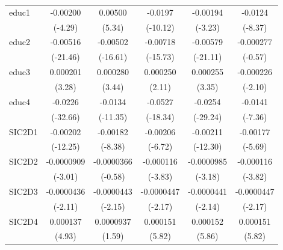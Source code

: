 \begin{table}[htbp]
\begin{tabular}{l*{5}{c}}
educ1       &    -0.00200\sym{***}&     0.00500\sym{***}&     -0.0197\sym{***}&    -0.00194\sym{**} &     -0.0124\sym{***}\\
            &     (-4.29)         &      (5.34)         &    (-10.12)         &     (-3.23)         &     (-8.37)         \\
educ2       &    -0.00516\sym{***}&    -0.00502\sym{***}&    -0.00718\sym{***}&    -0.00579\sym{***}&   -0.000277         \\
            &    (-21.46)         &    (-16.61)         &    (-15.73)         &    (-21.11)         &     (-0.57)         \\
educ3       &    0.000201\sym{**} &    0.000280\sym{***}&    0.000250\sym{*}  &    0.000255\sym{***}&   -0.000226\sym{*}  \\
            &      (3.28)         &      (3.44)         &      (2.11)         &      (3.35)         &     (-2.10)         \\
educ4       &     -0.0226\sym{***}&     -0.0134\sym{***}&     -0.0527\sym{***}&     -0.0254\sym{***}&     -0.0141\sym{***}\\
            &    (-32.66)         &    (-11.35)         &    (-18.34)         &    (-29.24)         &     (-7.36)         \\
SIC2D1      &    -0.00202\sym{***}&    -0.00182\sym{***}&    -0.00206\sym{***}&    -0.00211\sym{***}&    -0.00177\sym{***}\\
            &    (-12.25)         &     (-8.38)         &     (-6.72)         &    (-12.30)         &     (-5.69)         \\
SIC2D2      &  -0.0000909\sym{**} &  -0.0000366         &   -0.000116\sym{***}&  -0.0000985\sym{**} &   -0.000116\sym{***}\\
            &     (-3.01)         &     (-0.58)         &     (-3.83)         &     (-3.18)         &     (-3.82)         \\
SIC2D3      &  -0.0000436\sym{*}  &  -0.0000443\sym{*}  &  -0.0000447\sym{*}  &  -0.0000441\sym{*}  &  -0.0000447\sym{*}  \\
            &     (-2.11)         &     (-2.15)         &     (-2.17)         &     (-2.14)         &     (-2.17)         \\
SIC2D4      &    0.000137\sym{***}&   0.0000937         &    0.000151\sym{***}&    0.000152\sym{***}&    0.000151\sym{***}\\
            &      (4.93)         &      (1.59)         &      (5.82)         &      (5.86)         &      (5.82)         \\

\end{tabular}
\end{table}
